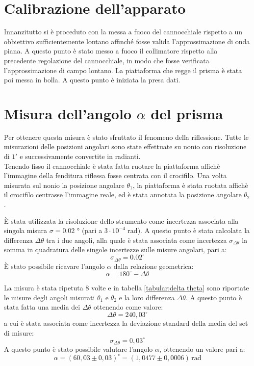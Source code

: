 \documentclass{article}
\begin{document}
    \section{Calibrazione dell'apparato}

        Innanzitutto si è proceduto con la messa a fuoco del cannocchiale rispetto a un obbiettivo sufficientemente lontano 
        affinché fosse valida l'approssimazione di onda piana. A questo punto è stato messo a fuoco il collimatore 
        rispetto alla precedente regolazione del cannocchiale, in modo che fosse verificata l'approssimazione di campo lontano. 
        La piattaforma che regge il prisma è stata poi messa in bolla. A questo punto è iniziata la presa dati.


    \section{Misura dell'angolo $\alpha$ del prisma}

        Per ottenere questa misura è stato sfruttato il fenomeno della riflessione. Tutte le misurazioni delle posizioni angolari sono state effettuate
        su nonio con risoluzione di $1'$ e  successivamente  convertite in radianti. \\
        Tenendo fisso il cannocchiale è stata fatta ruotare la piattaforma affichè l'immagine della fenditura riflessa fosse centrata 
        con il crocifilo. Una volta misurata sul nonio la posizione angolare $\theta_1$, la piattaforma è stata ruotata affichè il crocifilo 
        centrasse l'immagine reale, ed è stata annotata la posizione angolare $\theta_2$.
        
        È stata utilizzata la risoluzione dello strumento come incertezza associata alla singola misura $\sigma = 0.02$ ° (pari a $3 \cdot 10^{-4}$ rad). 
        A questo punto è stata calcolata la differenza $\Delta\theta$ tra i due angoli, alla quale è stata associata come incertezza $\sigma_{\Delta\theta}$ 
        la somma in quadratura delle singole incertezze sulle misure angolari, pari a: \[ \sigma_{\Delta\theta} = 0.02 ^\circ \]
        È stato possibile ricavare l'angolo $\alpha$ dalla relazione geometrica: \[ \alpha = 180 ^\circ - \Delta\theta \]

        La misura è stata ripetuta 8 volte e in tabella \ref{tabular:delta theta} sono riportate le misure degli angoli misurati $\theta_1$ e $\theta_2$ 
        e la loro differenza $\Delta\theta$. A questo punto è stata fatta una media dei $\Delta\theta$ ottenendo come valore:
        \[ \Delta\theta = 240,03^\circ \] a cui è stata associata come incertezza la deviazione standard della media del set di misure:
        \[ \sigma_{\Delta\theta} = 0,03^\circ \]
        A questo punto è stato possibile valutare l'angolo $\alpha$, ottenendo un valore pari a: 
        \[\alpha = (60,03\pm 0,03)^\circ = (1,0477\pm 0,0006)\, \mathrm{rad}\]
\end{document}
